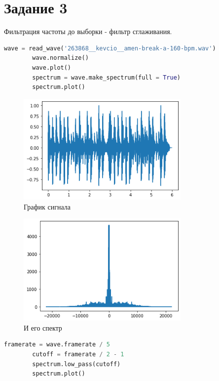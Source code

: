 \documentclass[a4paper, 12pt]{report}
\begin{document}
	\section{Задание 3}
	Фильтрация частоты до выборки - фильтр сглаживания.
	\begin{lstlisting}[language=Python,caption=Соло на барабане]
		wave = read_wave('263868__kevcio__amen-break-a-160-bpm.wav')
		wave.normalize()
		wave.plot()
		spectrum = wave.make_spectrum(full = True)
		spectrum.plot()
	\end{lstlisting}
	\begin{figure}[H]
		\centering
		\includegraphics[width=0.75\textwidth]{task1.png}
		\caption{График сигнала}
		\label{fig:task1}
	\end{figure}
	\begin{figure}[H]
		\centering
		\includegraphics[width=0.75\textwidth]{task2.png}
		\caption{И его спектр}
		\label{fig:task2}
	\end{figure}
	\begin{lstlisting}[language=Python,caption=Фильтр сглаживания]
		framerate = wave.framerate / 5
		cutoff = framerate / 2 - 1
		spectrum.low_pass(cutoff)
		spectrum.plot()
	\end{lstlisting}
\end{document}

